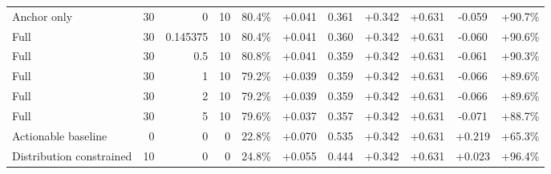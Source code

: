 \begin{table}[htbp]
\begin{tabular}{lrrrccccccc}
Anchor only & 30 & 0 & 10 & 80.4\% & +0.041 & 0.361 & +0.342 & +0.631 & -0.059 & +90.7\% \\
Full & 30 & 0.145375 & 10 & 80.4\% & +0.041 & 0.360 & +0.342 & +0.631 & -0.060 & +90.6\% \\
Full & 30 & 0.5 & 10 & 80.8\% & +0.041 & 0.359 & +0.342 & +0.631 & -0.061 & +90.3\% \\
Full & 30 & 1 & 10 & 79.2\% & +0.039 & 0.359 & +0.342 & +0.631 & -0.066 & +89.6\% \\
Full & 30 & 2 & 10 & 79.2\% & +0.039 & 0.359 & +0.342 & +0.631 & -0.066 & +89.6\% \\
Full & 30 & 5 & 10 & 79.6\% & +0.037 & 0.357 & +0.342 & +0.631 & -0.071 & +88.7\% \\
Actionable baseline & 0 & 0 & 0 & 22.8\% & +0.070 & 0.535 & +0.342 & +0.631 & +0.219 & +65.3\% \\
Distribution constrained & 10 & 0 & 0 & 24.8\% & +0.055 & 0.444 & +0.342 & +0.631 & +0.023 & +96.4\% \\
\bottomrule
\end{tabular}
\end{table}